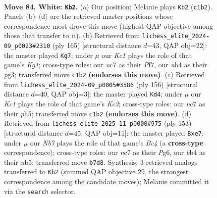 \documentclass[11pt]{article}
\begin{document}
\begin{figure}[p]\centering
\begin{subfigure}{0.46\textwidth}\centering
\resizebox{\linewidth}{!}{%
\newchessgame
\chessboard[
  setfen={8/1Nn5/4k3/p7/Pb1pP2n/1P1B3p/4P3/2K5 w - - 34 84},
  showmover=false,
  pgfstyle=straightmove, color=movearrow, markmove={c1-b2}
]}
\caption{}
\end{subfigure}\hfill
\begin{subfigure}{0.46\textwidth}\centering
\resizebox{\linewidth}{!}{%
\newchessgame
\chessboard[
  setfen={6k1/4bp2/5p2/4pP1p/2K1N2P/6P1/8/8 b - - 9 83},
  showmover=false,
  pgfstyle=straightmove, color=movearrow, markmove={g8-g7}
]}
\caption{}
\end{subfigure}
\\[4pt]
\begin{subfigure}{0.46\textwidth}\centering
\resizebox{\linewidth}{!}{%
\newchessgame
\chessboard[
  setfen={8/8/p3pBk1/Pb2P2p/1P5P/2K5/8/8 w - - 38 79},
  showmover=false,
  pgfstyle=straightmove, color=movearrow, markmove={c3-d4}
]}
\caption{}
\end{subfigure}\hfill
\begin{subfigure}{0.46\textwidth}\centering
\resizebox{\linewidth}{!}{%
\newchessgame
\chessboard[
  setfen={8/4P3/1p4p1/1Nb4p/5P1P/1k4P1/p7/K7 b - - 0 77},
  showmover=false,
  pgfstyle=straightmove, color=movearrow, markmove={c5-e7}
]}
\caption{}
\end{subfigure}
\caption{\textbf{Move 84, White: \texttt{Kb2}.} (a) Our position; Melanie plays \texttt{Kb2} (\texttt{c1b2}). Panels (b)--(d) are the retrieved master positions whose correspondence most drove this move (highest QAP objective among those that transfer to it). (b) Retrieved from \texttt{lichess\_elite\_2024-09\_p0023\#2310} (ply 165) [structural distance $d$=43, QAP obj=22]: the master played \texttt{Kg7}; under $\mu$ our \emph{Kc1} plays the role of that game's \emph{Kg1}; cross-type roles: our \emph{n}c7 as their \emph{P}f7, our \emph{n}h4 as their \emph{p}g3; transferred move \texttt{c1b2} \textbf{(endorses this move)}. (c) Retrieved from \texttt{lichess\_elite\_2024-09\_p0005\#3586} (ply 156) [structural distance $d$=40, QAP obj=3]: the master played \texttt{Kd4}; under $\mu$ our \emph{Kc1} plays the role of that game's \emph{Kc3}; cross-type roles: our \emph{n}c7 as their \emph{p}h5; transferred move \texttt{c1b2} \textbf{(endorses this move)}. (d) Retrieved from \texttt{lichess\_elite\_2025-11\_p0000\#975} (ply 153) [structural distance $d$=45, QAP obj=11]: the master played \texttt{Bxe7}; under $\mu$ our \emph{Nb7} plays the role of that game's \emph{Bc4} (a \textbf{cross-type} correspondence); cross-type roles: our \emph{n}c7 as their \emph{P}g6, our \emph{b}b4 as their \emph{n}b5; transferred move \texttt{b7d8}. Synthesis: 3 retrieved analogs transferred to \texttt{Kb2} (summed QAP objective 29, the strongest correspondence among the candidate moves); Melanie committed it via the \texttt{search} selector.}
\label{fig:thought-m166}
\end{figure}
\end{document}
